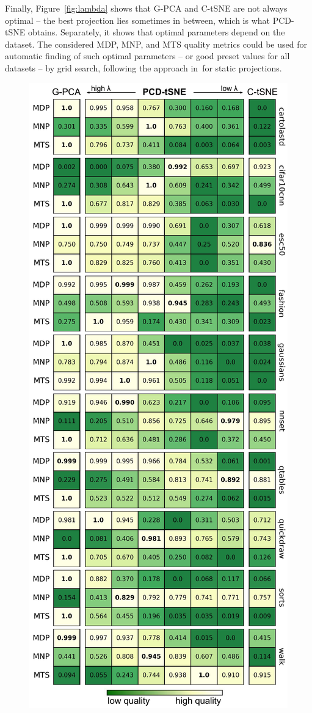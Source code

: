 Finally, Figure~\ref{fig:lambda} shows that G-PCA and C-tSNE are not always optimal -- the best projection lies sometimes in between, which is what PCD-tSNE obtains. Separately, it shows that optimal parameters depend on the dataset. The considered MDP, MNP, and MTS quality metrics could be used for automatic finding of such optimal parameters -- or good preset values for all datasets -- by grid search, following the approach in\,\cite{Espadoto2019} for static projections.

\begin{figure}[htb!]\centering
 \includegraphics[width=.78\linewidth]{figures/projection-algorithm/lambda-influence-on-metrics.pdf}

\end{figure}
